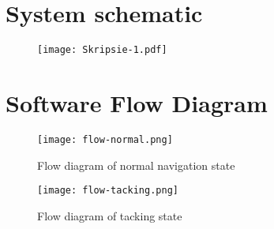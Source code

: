 \graphicspath{{appendices/fig/}}

\chapter{System schematic}
\makeatletter{}\makeatother
\label{appen:system}

\begin{figure}[!h]
    \centering
    \texttt{[image: Skripsie-1.pdf]}
\end{figure}

\chapter{Software Flow Diagram}
\makeatletter{}\makeatother
\label{appen:flow}

\begin{figure}[!h]
    \centering
    \texttt{[image: flow-normal.png]}
    \label{fig:normal-flow}
    \caption[Flow diagram of normal navigation state]{Flow diagram of normal navigation state}
\end{figure}

\begin{figure}[!h]
    \centering
    \texttt{[image: flow-tacking.png]}
    \label{fig:tacking-flow}
    \caption[Flow diagram of tacking state]{Flow diagram of tacking state}
\end{figure}

